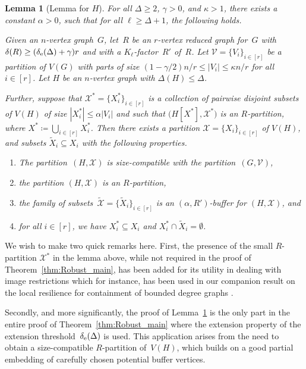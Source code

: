 \documentclass[final]{article}
\newtheorem{lemma}[theorem]{Lemma}
\theoremstyle{definition}
\newcommand{\itmarab}[1]{\mbox{\rm 
({\it #1}\,\arabic{*}\hspace{0.05em})}}
\newcommand{\exth}{\delta_{\rm e}(\Delta)}
\let\tilde\widetilde
\begin{document}
 \begin{lemma}[Lemma for $H$]
    \label{lem:Lemma_H}
    For all $\Delta \geq 2$, $\gamma > 0$, and $\kappa > 1$, there exists a constant $\alpha > 0$, such that for all $\ell \geq \Delta+1$, the following holds. 
    
    Given an $n$-vertex graph~$G$, let~$R$ be an $r$-vertex reduced graph for~$G$ with ${\delta(R) \geq (\exth+ \gamma)r}$ and with a $K_{\ell}$-factor~$R'$ of~$R$. Let $\mathcal{V} = \{V_i\}_{i \in [r]}$ be a partition of $V(G)$ with parts of size $(1 -\gamma/2 ){n}/{r} \leq |V_i| \leq \kappa n/r$ for all $i \in [r]$. Let $H$ be an $n$-vertex graph with $\Delta(H) \leq \Delta$.
    
    Further, suppose that $\mathcal{X}^* = \{X^*_i\}_{i \in [r]}$ is a collection of pairwise disjoint subsets  of $V(H)$ of size $|X^*_i| \leq \alpha |V_i|$ and such that $\bigl(H[X^*], \mathcal{X}^*\bigr)$ is an $R$-partition, where $X^* \coloneqq \bigcup_{i \in [r]} X_i^*$. Then there exists a partition $\mathcal{X} = \{X_{i}\}_{i \in [r]}$ of $V(H)$, and subsets $\tilde{X}_i \subseteq X_i$ with the following properties. 
    \begin{enumerate}[label=\itmarab{H}]
    \item \label{itm:H1} The partition~$(H, \mathcal{X})$ is size-compatible with the partition~$(G,\mathcal{V})$,
    \item \label{itm:H2} the partition $(H, \mathcal{X})$ is an $R$-partition, 
    \item \label{itm:H3} the family of subsets~$\tilde{\mathcal{X}} = \{\tilde{X}_i\}_{i \in [r]}$ is an $(\alpha, R')$-buffer for $(H, \mathcal{X})$, and
    \item \label{itm:H4} for all $i \in [r]$, we have $X_i^* \subseteq X_i$ and $X_i^* \cap \tilde{X}_i = \emptyset$.
    \end{enumerate}
\end{lemma}

We wish to make two quick remarks here. First, the presence of the small $R$-partition $\mathcal{X}^*$ in the lemma above, while not required in the proof of Theorem~\ref{thm:Robust_main}, has been added for its utility in dealing with image restrictions which for instance, has been used in our companion result on the local resilience for containment of bounded degree graphs \cite{ABKN_resil}. 

Secondly, and more significantly, the proof of Lemma~\ref{lem:Lemma_H} is the only part in the entire proof of Theorem~\ref{thm:Robust_main} where the extension property of the extension threshold~$\exth$ is used. This application arises from the need to obtain a size-compatible $R$-partition of~$V(H)$, which builds on a good partial embedding of carefully chosen potential buffer vertices. 
\end{document}
